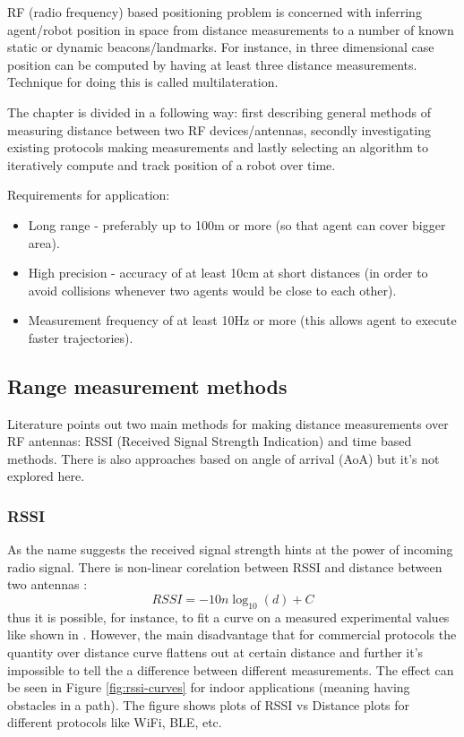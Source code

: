 RF (radio frequency) based positioning problem is concerned with inferring agent/robot position in space from distance measurements to a number of known static or dynamic beacons/landmarks. For instance, in three dimensional case position can be computed by having at least three distance measurements. Technique for doing this is called multilateration.

The chapter is divided in a following way: first describing general methods of measuring distance between two RF devices/antennas, secondly investigating existing protocols making measurements and lastly selecting an algorithm to iteratively compute and track position of a robot over time.

Requirements for application:
\begin{itemize}
    \item Long range - preferably up to 100m or more (so that agent can cover bigger area).
    \item High precision - accuracy of at least 10cm at short distances (in order to avoid collisions whenever two agents would be close to each other).
    \item Measurement frequency of at least 10Hz or more (this allows agent to execute faster trajectories).
\end{itemize}

\subsection{Range measurement methods}

Literature points out two main methods for making distance measurements over RF antennas: RSSI (Received Signal Strength Indication) and time based methods. There is also approaches based on angle of arrival (AoA) but it's not explored here.

\subsubsection{RSSI}

As the name suggests the received signal strength hints at the power of incoming radio signal. There is non-linear corelation between RSSI and distance between two antennas \cite{rssi-curves}:
$$
    R S S I=-10 n \log _{10}(d)+C
$$
thus it is possible, for instance, to fit a curve on a measured experimental values like shown in \cite{rssi-curves}. However, the main disadvantage that for commercial protocols the quantity over distance curve flattens out at certain distance and further it's impossible to tell the a difference between different measurements. The effect can be seen in Figure \ref{fig:rssi-curves} for indoor applications (meaning having obstacles in a path). The figure shows plots of RSSI vs Distance plots for different protocols like WiFi, BLE, etc.

